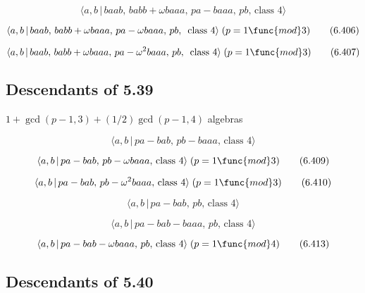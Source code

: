 \documentclass[10pt]{article}
\begin{document}
\begin{equation}
\langle a,b\,|\,baab,\,babb+\omega baaa,\,pa-baaa,\,pb,\,\text{class }%
4\rangle  \tag{6.405}
\end{equation}

\begin{equation}
\langle a,b\,|\,baab,\,babb+\omega baaa,\,pa-\omega baaa,\,pb,\,\text{ class 
}4\rangle\;(p=1 \func{mod} 3)  \tag{6.406}
\end{equation}

\begin{equation}
\langle a,b\,|\,baab,\,babb+\omega baaa,\,pa-\omega ^2baaa,\,pb,\,\text{
class }4\rangle\;(p=1 \func{mod} 3)  \tag{6.407}
\end{equation}

\subsection{Descendants of 5.39}

$1+\gcd (p-1,3)+(1/2)\gcd (p-1,4)$ algebras

\begin{equation}
\langle a,b\,|\,pa-bab,\,pb-baaa,\,\text{class }4\rangle  \tag{6.408}
\end{equation}

\begin{equation}
\langle a,b\,|\,pa-bab,\,pb-\omega baaa,\,\text{class }4\rangle\;(p=1 \func{%
mod} 3)  \tag{6.409}
\end{equation}

\begin{equation}
\langle a,b\,|\,pa-bab,\,pb-\omega ^2baaa,\,\text{class }4\rangle\;(p=1 
\func{mod} 3)  \tag{6.410}
\end{equation}

\begin{equation}
\langle a,b\,|\,pa-bab,\,pb,\,\text{class }4\rangle  \tag{6.411}
\end{equation}

\begin{equation}
\langle a,b\,|\,pa-bab-baaa,\,pb,\,\text{class }4\rangle  \tag{6.412}
\end{equation}

\begin{equation}
\langle a,b\,|\,pa-bab-\omega baaa,\,pb,\,\text{class }4\rangle\;(p=1 \func{%
mod} 4)  \tag{6.413}
\end{equation}

\subsection{Descendants of 5.40}
\end{document}
